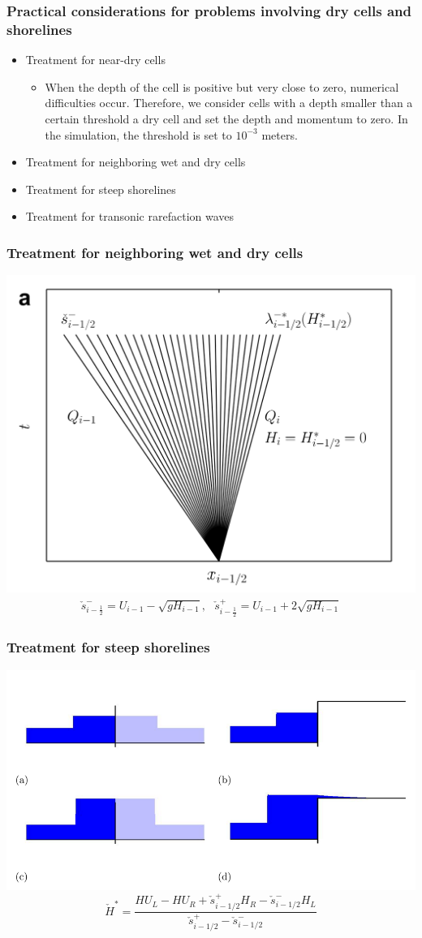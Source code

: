 \documentclass{beamer}
\begin{document}
\frame
{\frametitle{Practical considerations for problems involving dry cells and shorelines}
\begin{itemize}
\item Treatment for near-dry cells
\begin{itemize}
\item When the depth of the cell is positive but very close to zero, numerical difficulties occur. Therefore, we consider cells with a depth smaller than a certain threshold a dry cell and set the depth and momentum to zero. In the simulation, the threshold is set to $10^{-3}$ meters.
\end{itemize}
\item Treatment for neighboring wet and dry cells
\item Treatment for steep shorelines
\item Treatment for transonic rarefaction waves
\end{itemize}
}


\frame
{
\frametitle{Treatment for neighboring wet and dry cells}
\includegraphics[width=0.83\linewidth]{wetanddry.png}
\begin{align*}
\check s_{i-\frac{1}{2}}^-=U_{i-1}-\sqrt{g H_{i-1}}, ~~~ \check s_{i-\frac{1}{2}}^+=U_{i-1}+2\sqrt{g H_{i-1}}
\end{align*}
}

\frame
{
\frametitle{Treatment for steep shorelines}
\includegraphics[width=0.83\linewidth]{steep.png}
\begin{equation}
\check{H}^*=\frac{HU_{L}-HU_R+\check{s}_{i-1/2}^+ H_R-\check{s}_{i-1/2}^- H_L}{\check{s}_{i-1/2}^+-\check{s}_{i-1/2}^-}
\end{equation}
}
\end{document}

